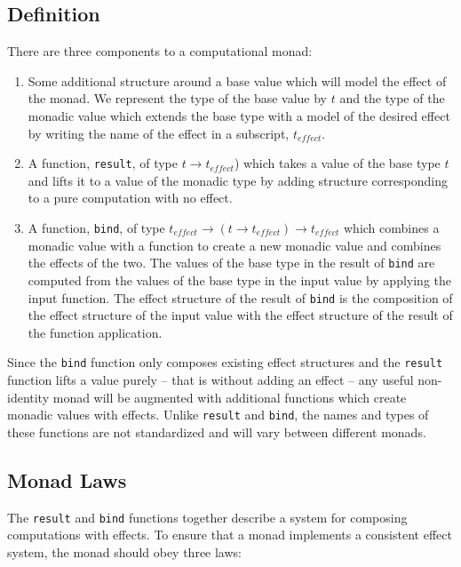 \documentclass[natbib,10pt]{sigplanconf}
\begin{document}
\subsection{Definition}

There are three components to a computational monad:
\begin{enumerate}
\item
Some additional structure around a base value which will model the
effect of the monad.  We represent the type of the base value by
$t$ and the type of the monadic value which extends the base type
with a model of the desired effect by writing the name of the effect
in a subscript, $t_{effect}$.

\item
A function, {\tt result}, of type $t \rightarrow t_{effect}$) which
takes a value of the base type $t$ and lifts it to a value of the
monadic type by adding structure corresponding to a pure computation
with no effect.

\item
A function, {\tt bind}, of type $t_{effect} \rightarrow (t \rightarrow
t_{effect}) \rightarrow t_{effect}$ which combines a monadic value
with a function to create a new monadic value and combines the effects
of the two.  The values of the base type in the result of {\tt bind}
are computed from the values of the base type in the input value by
applying the input function.  The effect structure of the result of
{\tt bind} is the composition of the effect structure of the input
value with the effect structure of the result of the function
application.
\end{enumerate}

Since the {\tt bind} function only composes existing effect structures
and the {\tt result} function lifts a value purely -- that is without
adding an effect -- any useful non-identity monad will be augmented
with additional functions which create monadic values with effects.
Unlike {\tt result} and {\tt bind}, the names and types of these
functions are not standardized and will vary between different monads.

\subsection{Monad Laws}

The {\tt result} and {\tt bind} functions together describe a system
for composing computations with effects.  To ensure that a monad
implements a consistent effect system, the monad should obey three laws:
\end{document}

